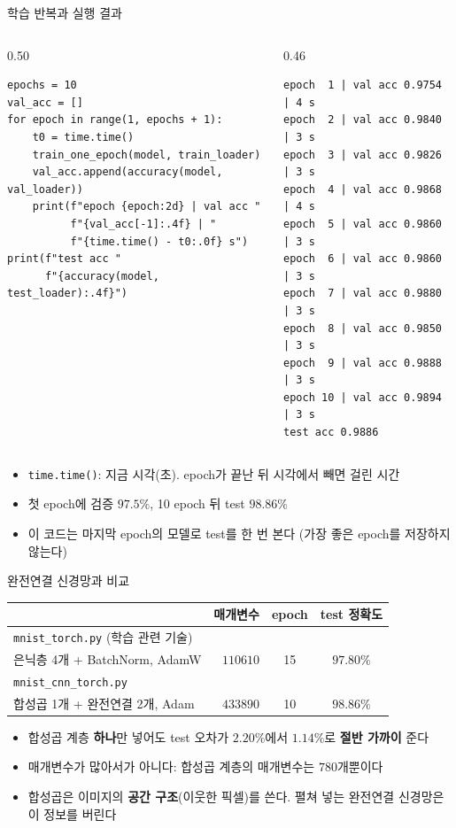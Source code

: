 \documentclass[aspectratio=169,11pt]{beamer}
\newcommand{\codesmall}{\ttfamily\fontsize{7.4}{8.3}\selectfont}
\newcommand{\code}[1]{\texttt{#1}}
\begin{document}
\begin{frame}[fragile]{학습 반복과 실행 결과}
\begin{columns}[T,onlytextwidth]
\begin{column}{0.50\textwidth}
\begin{lstlisting}[basicstyle=\codesmall]
epochs = 10
val_acc = []
for epoch in range(1, epochs + 1):
    t0 = time.time()
    train_one_epoch(model, train_loader)
    val_acc.append(accuracy(model, val_loader))
    print(f"epoch {epoch:2d} | val acc "
          f"{val_acc[-1]:.4f} | "
          f"{time.time() - t0:.0f} s")
print(f"test acc "
      f"{accuracy(model, test_loader):.4f}")
\end{lstlisting}
\end{column}
\begin{column}{0.46\textwidth}
\begin{lstlisting}[style=outstyle,basicstyle=\codesmall]
epoch  1 | val acc 0.9754 | 4 s
epoch  2 | val acc 0.9840 | 3 s
epoch  3 | val acc 0.9826 | 3 s
epoch  4 | val acc 0.9868 | 4 s
epoch  5 | val acc 0.9860 | 3 s
epoch  6 | val acc 0.9860 | 3 s
epoch  7 | val acc 0.9880 | 3 s
epoch  8 | val acc 0.9850 | 3 s
epoch  9 | val acc 0.9888 | 3 s
epoch 10 | val acc 0.9894 | 3 s
test acc 0.9886
\end{lstlisting}
\end{column}
\end{columns}
\small
\begin{itemize}
\item \code{time.time()}: 지금 시각(초). epoch가 끝난 뒤 시각에서 빼면 걸린 시간
\item 첫 epoch에 검증 $97.5\%$, 10 epoch 뒤 test $98.86\%$
\item 이 코드는 마지막 epoch의 모델로 test를 한 번 본다 (가장 좋은 epoch를 저장하지 않는다)
\end{itemize}
\end{frame}

\begin{frame}{완전연결 신경망과 비교}
\centering
\small
\renewcommand{\arraystretch}{1.3}
\begin{tabular}{>{\raggedright}p{6.6cm}rcc}
\toprule
& \textbf{매개변수} & \textbf{epoch} & \textbf{test 정확도} \\
\midrule
\code{mnist\_torch.py} (학습 관련 기술)\\ 은닉층 4개 + BatchNorm, AdamW & $110610$ & 15 & $97.80\%$ \\
\code{mnist\_cnn\_torch.py}\\ 합성곱 1개 + 완전연결 2개, Adam & $433890$ & 10 & $98.86\%$ \\
\bottomrule
\end{tabular}
\raggedright
\vskip3mm
\begin{itemize}
\item 합성곱 계층 \textbf{하나}만 넣어도 test 오차가 $2.20\%$에서 $1.14\%$로 \textbf{절반 가까이} 준다
\item 매개변수가 많아서가 아니다: 합성곱 계층의 매개변수는 $780$개뿐이다
\item 합성곱은 이미지의 \textbf{공간 구조}(이웃한 픽셀)를 쓴다. 펼쳐 넣는 완전연결 신경망은 이 정보를 버린다
\end{itemize}
\end{frame}
\end{document}
